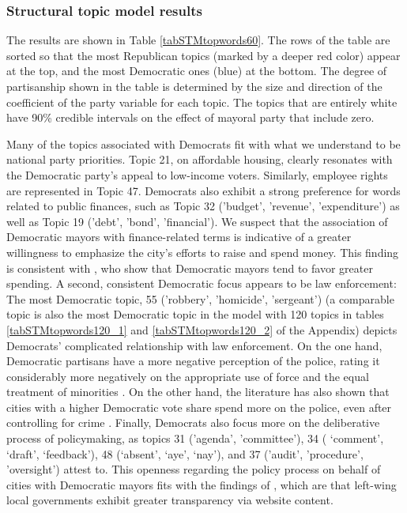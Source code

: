 \documentclass[11pt]{article}
\begin{document}
\subsubsection{Structural topic model results}


The results are shown in Table \ref{tabSTMtopwords60}. The rows of the table are sorted so that the most Republican topics (marked by a deeper red color) appear at the top, and the most Democratic ones (blue) at the bottom. The degree of partisanship shown in the table is determined by the size and direction of the coefficient of the party variable for each topic. The topics that are entirely white have 90\% credible intervals on the effect of mayoral party that include zero.

Many of the topics associated with Democrats fit with what we understand to be national party priorities. Topic 21, on affordable housing, clearly resonates with the Democratic party's appeal to low-income voters. Similarly, employee rights are represented in Topic 47. Democrats also exhibit a strong preference for words related to public finances, such as Topic 32 ('budget', 'revenue', 'expenditure') as well as Topic 19 ('debt', 'bond', 'financial'). We suspect that the association of Democratic mayors with finance-related terms is indicative of a greater willingness to emphasize the city's efforts to raise and spend money. This finding is consistent with \citep{Einstein2015}, who show that Democratic mayors tend to favor greater spending. A second, consistent Democratic focus appears to be law enforcement: The most Democratic topic, 55 ('robbery', 'homicide', 'sergeant') (a comparable topic is also the most Democratic topic in the model with 120 topics in tables \ref{tabSTMtopwords120_1} and \ref{tabSTMtopwords120_2} of the Appendix) depicts Democrats' complicated relationship with law enforcement. On the one hand, Democratic partisans have a more negative perception of the police, rating it considerably more negatively on the appropriate use of force and the equal treatment of minorities \citep{Brown2017}. On the other hand, the literature has also shown that cities with a higher Democratic vote share spend more on the police, even after controlling for crime \citep{Einstein2015}. Finally, Democrats also focus more on the deliberative process of policymaking, as topics 31 ('agenda', 'committee'), 34 ( `comment', `draft', `feedback'), 48 (`absent', `aye', `nay'), and 37 ('audit', 'procedure', 'oversight') attest to.  This openness regarding the policy process on behalf of cities with Democratic mayors fits with the findings of \citet{grimmelikhuijsen2012developing}, which are that left-wing local governments exhibit greater transparency via website content.
\end{document}
